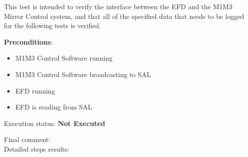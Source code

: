 \documentclass[SE,lsstdraft,STR,toc]{lsstdoc}
\providecommand{\tightlist}{
  \setlength{\itemsep}{0pt}\setlength{\parskip}{0pt}}
\begin{document}
This test is intended to verify the interface between the EFD and the
M1M3 Mirror Control system, and that all of the specified data that
needs to be logged for the following tests is verified.~

\textbf{ Preconditions}:\\
\begin{itemize}
\tightlist
\item
  M1M3 Control Software running
\item
  M1M3 Control Software broadcasting to SAL
\item
  EFD running
\item
  EFD is reading from SAL~
\end{itemize}

Execution status: {\bf Not Executed }

Final comment:\\


Detailed steps results:
\end{document}
